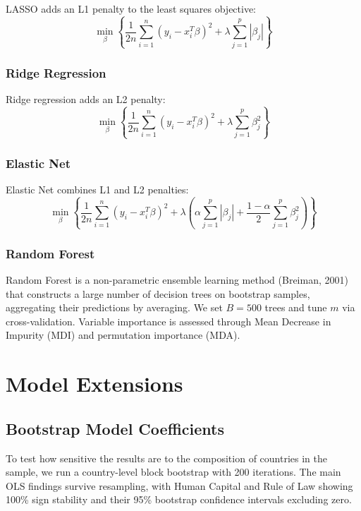 \documentclass[12pt,a4paper]{report}
\begin{document}
\begin{appendices}
LASSO adds an L1 penalty to the least squares objective:
\begin{equation}
\min_{\beta} \left\{ \frac{1}{2n} \sum_{i=1}^{n} (y_i - x_i^T \beta)^2 + \lambda \sum_{j=1}^{p} |\beta_j| \right\}
\end{equation}

\subsection{Ridge Regression}

Ridge regression adds an L2 penalty:
\begin{equation}
\min_{\beta} \left\{ \frac{1}{2n} \sum_{i=1}^{n} (y_i - x_i^T \beta)^2 + \lambda \sum_{j=1}^{p} \beta_j^2 \right\}
\end{equation}

\subsection{Elastic Net}

Elastic Net combines L1 and L2 penalties:
\begin{equation}
\min_{\beta} \left\{ \frac{1}{2n} \sum_{i=1}^{n} (y_i - x_i^T \beta)^2 + \lambda \left( \alpha \sum_{j=1}^{p} |\beta_j| + \frac{1 - \alpha}{2} \sum_{j=1}^{p} \beta_j^2 \right) \right\}
\end{equation}

\subsection{Random Forest}

Random Forest is a non-parametric ensemble learning method (Breiman, 2001) that constructs a large number of decision trees on bootstrap samples, aggregating their predictions by averaging. We set $B = 500$ trees and tune $m$ via cross-validation. Variable importance is assessed through Mean Decrease in Impurity (MDI) and permutation importance (MDA).


\chapter{Model Extensions}

\section{Bootstrap Model Coefficients}

To test how sensitive the results are to the composition of countries in the sample, we run a country-level block bootstrap with 200 iterations. The main OLS findings survive resampling, with Human Capital and Rule of Law showing 100\% sign stability and their 95\% bootstrap confidence intervals excluding zero.


\end{appendices}
\end{document}
